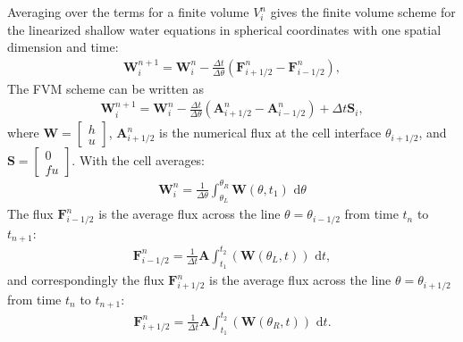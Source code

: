 Averaging over the terms for a finite volume $V_i^n$ gives the finite volume scheme for the linearized shallow water equations in spherical coordinates with one spatial dimension and time:
\begin{align}
    \mathbf{W}_i^{n+1} = \mathbf{W}_i^n - \frac{\Delta t}{\Delta \theta} (\mathbf{F}_{i+1/2}^n - \mathbf{F}_{i-1/2}^n),	
\end{align}
The FVM scheme can be written as 
\begin{align*}
    \mathbf{W}_i^{n+1} = \mathbf{W}_i^n - \frac{\Delta t}{\Delta \theta} (\mathbf{A}_{i+1/2}^n - \mathbf{A}_{i-1/2}^n) + \Delta t \mathbf{S}_i,
\end{align*}
where $\mathbf{W} = \begin{bmatrix} h \\ u \end{bmatrix}$, $\mathbf{A}_{i+1/2}^n$ is the numerical flux at the cell interface $\theta_{i+1/2}$, and $\mathbf{S} = \begin{bmatrix} 0 \\ fu \end{bmatrix}.$ 
With the cell averages:
\begin{align*}
    \mathbf{W}_i^{n} = \frac{1}{\Delta \theta} \int_{\theta_L}^{\theta_R} \mathbf{W}(\theta, t_1) \text{ d}\theta
\end{align*}
The flux $\mathbf{F}_{i-1/2}^n$ is the average flux across the line $\theta = \theta_{i-1/2}$ from time $t_n$ to $t_{n+1}$:
\begin{align*}
    \mathbf{F}_{i-1/2}^n = \frac{1}{\Delta t} \mathbf{A} \int_{t_1}^{t_{2}} (\mathbf{W}(\theta_L, t)) \text{ d}t,
\end{align*}
and correspondingly the flux $\mathbf{F}_{i+1/2}^n$ is the average flux across the line $\theta = \theta_{i+1/2}$ from time $t_n$ to $t_{n+1}$:
\begin{align*}
    \mathbf{F}_{i+1/2}^n = \frac{1}{\Delta t} \mathbf{A} \int_{t_1}^{t_{2}} (\mathbf{W}(\theta_R, t)) \text{ d}t.
\end{align*}

